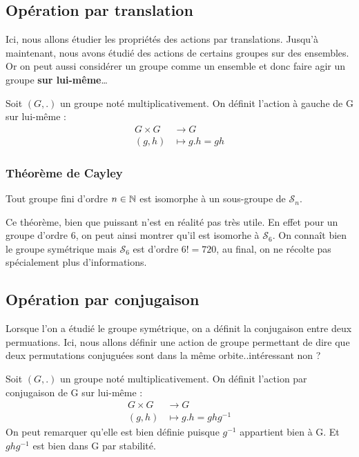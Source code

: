 \subsection{Opération par translation}

Ici, nous allons étudier les propriétés des actions par translations. 
Jusqu'à maintenant, nous avons étudié des actions de certains groupes sur des ensembles. 
Or on peut aussi considérer un groupe comme un ensemble et donc faire agir un groupe \textbf{sur lui-même}\dots

\newpage 

\begin{definition}
	Soit $(G,.)$ un groupe noté multiplicativement. On définit l'action à gauche de G sur lui-même :
		\begin{align*}
			G \times G &\longrightarrow G \\ 
			(g,h) &\longmapsto g.h = gh 
		\end{align*}
\end{definition}

\subsubsection{Théorème de Cayley}

\begin{theorem}[Cayley, 1878]
	Tout groupe fini d'ordre $n \in \mathbb{N}$ est isomorphe à un sous-groupe de $\mathcal{S}_n$. 
\end{theorem}

Ce théorème, bien que puissant n'est en réalité pas très utile. 
En effet pour un groupe d'ordre 6, on peut ainsi montrer qu'il est isomorhe à $\mathcal{S}_6$.
On connaît bien le groupe symétrique mais $\mathcal{S}_6$ est d'ordre $6! = 720$, au final, on ne récolte pas spécialement plus d'informations. 

\subsection{Opération par conjugaison}

Lorsque l'on a étudié le groupe symétrique, on a définit la conjugaison entre deux permuations. 
Ici, nous allons définir une action de groupe permettant de dire que deux permutations conjuguées
sont dans la même orbite..intéressant non ?

\begin{definition}
	Soit $(G,.)$ un groupe noté multiplicativement. On définit l'action par conjugaison de G sur lui-même :
		\begin{align*}
			G \times G &\longrightarrow G \\
			(g,h) &\longmapsto g.h = g h g^{-1}
		\end{align*}	
	On peut remarquer qu'elle est bien définie puisque $g^{-1}$ appartient bien à G. 
	Et $g h g^{-1}$ est bien dans G par stabilité. 
\end{definition}

